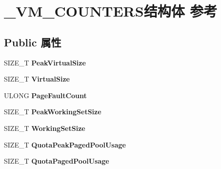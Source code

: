 \hypertarget{struct___v_m___c_o_u_n_t_e_r_s}{}\section{\+\_\+\+V\+M\+\_\+\+C\+O\+U\+N\+T\+E\+R\+S结构体 参考}
\label{struct___v_m___c_o_u_n_t_e_r_s}
\subsection*{Public 属性}
\begin{DoxyCompactItemize}
\item 
\mbox{\label{struct___v_m___c_o_u_n_t_e_r_s_aa5b60f08defdcae18e0e297ba4c570ac}} 
S\+I\+Z\+E\+\_\+T {\bfseries Peak\+Virtual\+Size}
\item 
\mbox{\label{struct___v_m___c_o_u_n_t_e_r_s_ab63829d11828450d6006ac92b9428454}} 
S\+I\+Z\+E\+\_\+T {\bfseries Virtual\+Size}
\item 
\mbox{\label{struct___v_m___c_o_u_n_t_e_r_s_a2757c07a0ab6cb6c18f21a6b761907ac}} 
U\+L\+O\+NG {\bfseries Page\+Fault\+Count}
\item 
\mbox{\label{struct___v_m___c_o_u_n_t_e_r_s_a16473d53e5eeb3bce8a49b778774e14e}} 
S\+I\+Z\+E\+\_\+T {\bfseries Peak\+Working\+Set\+Size}
\item 
\mbox{\label{struct___v_m___c_o_u_n_t_e_r_s_af0a15f39cbdc6ca7f155f483c210c4ba}} 
S\+I\+Z\+E\+\_\+T {\bfseries Working\+Set\+Size}
\item 
\mbox{\label{struct___v_m___c_o_u_n_t_e_r_s_a7255ba288a6c8b9f78bcd9fe87d0413d}} 
S\+I\+Z\+E\+\_\+T {\bfseries Quota\+Peak\+Paged\+Pool\+Usage}
\item 
\mbox{\label{struct___v_m___c_o_u_n_t_e_r_s_a4f1e002e0bbe6a5909d3b5db8224c7ae}} 
S\+I\+Z\+E\+\_\+T {\bfseries Quota\+Paged\+Pool\+Usage}
\item 
\mbox{\label{struct___v_m___c_o_u_n_t_e_r_s_a75f11fcff244329f15c3931ae073d964}} 

\end{DoxyCompactItemize}
